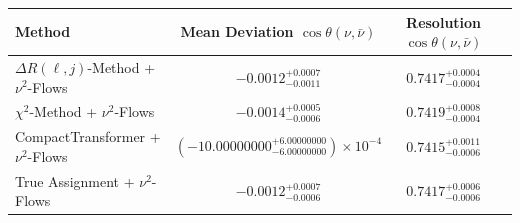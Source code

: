     \begin{tabular}{lccc}
        \toprule
        Method & Mean Deviation $\cos\theta(\nu, \bar{\nu})$ & Resolution $\cos\theta(\nu, \bar{\nu})$ \\
        \midrule
        $\Delta R(\ell,j)$-Method + $\nu^2$-Flows & $-0.0012^{+0.0007}_{-0.0011}$ & $0.7417^{+0.0004}_{-0.0004}$ \\
        $\chi^2$-Method + $\nu^2$-Flows & $-0.0014^{+0.0005}_{-0.0006}$ & $0.7419^{+0.0008}_{-0.0004}$ \\
        CompactTransformer + $\nu^2$-Flows & $(-10.00000000^{+6.00000000}_{-6.00000000})\times 10^{-4}$ & $0.7415^{+0.0011}_{-0.0006}$ \\
        True Assignment + $\nu^2$-Flows & $-0.0012^{+0.0007}_{-0.0006}$ & $0.7417^{+0.0006}_{-0.0006}$ \\
        \bottomrule
    \end{tabular}